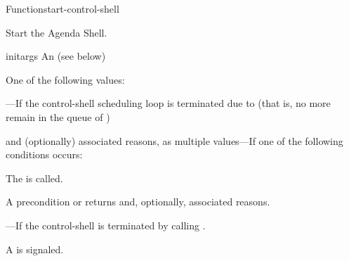 \documentclass[10pt,twoside,english,pdftex]{article}
\begin{document}
\begin{functiondoc}{Function}{start-control-shell}%
  { 
    \returns{} \superstar}
%
%
%
%

\fnsyntax

\fnpurpose Start the Agenda Shell.

\fnpackage {}

\fnmodule {}

\fnargs
\begin{args}{initargs}
\arg[initargs] An  (see below)
\end{args}

\fnreturns
One of the following values: 

\begin{tightitemize}
\item {}---If the control-shell scheduling loop is terminated
  due to  (that is, no more  remain
  in the queue of )
\item {} and (optionally) associated reasons, as multiple
  values---If one of the following conditions occurs:
\begin{tightitemize}
\item The \textbf{}  is
  called.
\item A precondition  or  
  returns  and, optionally, associated reasons.
\end{tightitemize}
\item {}---If the control-shell is terminated by
  calling \textbf{}.
\end{tightitemize}

\fnevents
{}%
%
%
A  is signaled.
 

\end{functiondoc}
\end{document}

